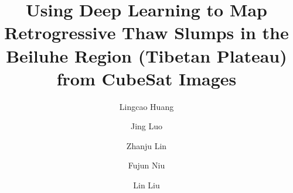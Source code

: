 \documentclass[authoryear,preprint,review,12pt]{elsarticle}
\begin{document}
\begin{frontmatter}




\title{Using Deep Learning to Map Retrogressive Thaw Slumps in the Beiluhe Region (Tibetan Plateau) from CubeSat Images}



\author[a]{Lingcao Huang}
\author[b]{Jing Luo}
\author[b]{Zhanju Lin}
\author[b]{Fujun Niu}
\author[a]{Lin Liu}


\address[a]{Earth System Science Programme, Faculty of Science, The Chinese University of Hong Kong, Hong Kong SAR, China.}
\address[b]{Northwest Institute of Eco-Environment and Resources, Chinese Academy of Sciences, LanZhou, China.}

\begin{abstract}


\end{abstract}
\end{frontmatter}
\end{document}

